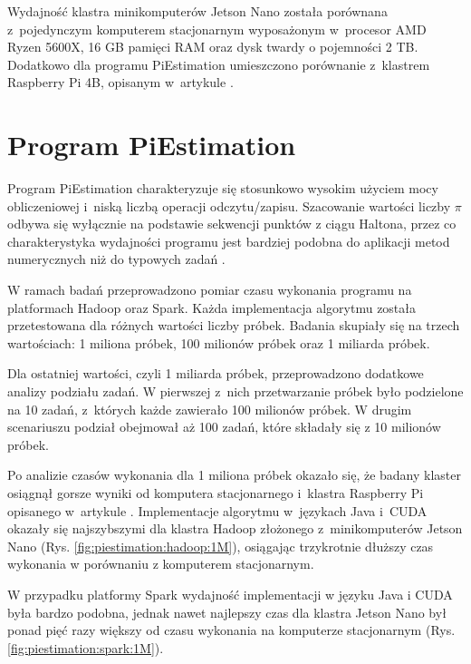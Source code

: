 Wydajność klastra minikomputerów Jetson Nano została porównana z~pojedynczym komputerem stacjonarnym
wyposażonym w~procesor AMD Ryzen 5600X, 16 GB pamięci RAM oraz dysk twardy o pojemności 2 TB.
Dodatkowo dla programu PiEstimation umieszczono porównanie z~klastrem Raspberry Pi 4B, opisanym
w~artykule \cite{rpi-cluster-2}.

\section{Program PiEstimation}

Program PiEstimation charakteryzuje się stosunkowo wysokim użyciem mocy obliczeniowej i~niską liczbą
operacji odczytu/zapisu. Szacowanie wartości liczby $\pi$ odbywa się wyłącznie na podstawie sekwencji
punktów z ciągu Haltona, przez co charakterystyka wydajności programu jest bardziej podobna do aplikacji
metod numerycznych niż do typowych zadań .

W ramach badań przeprowadzono pomiar czasu wykonania programu na platformach Hadoop oraz Spark.
Każda implementacja algorytmu została przetestowana dla różnych wartości liczby próbek. Badania
skupiały się na trzech wartościach: 1 miliona próbek, 100 milionów próbek oraz 1 miliarda próbek.

Dla ostatniej wartości, czyli 1 miliarda próbek, przeprowadzono dodatkowe analizy podziału zadań.
W pierwszej z~nich przetwarzanie próbek było podzielone na 10 zadań, z~których każde zawierało 100 milionów
próbek. W drugim scenariuszu podział obejmował aż 100 zadań, które składały się z 10 milionów próbek.

Po analizie czasów wykonania dla 1 miliona próbek okazało się, że badany klaster osiągnął gorsze wyniki
od komputera stacjonarnego i~klastra Raspberry Pi opisanego w~artykule \cite{rpi-cluster-2}. Implementacje
algorytmu w~językach Java i~CUDA okazały się najszybszymi dla klastra Hadoop złożonego z~minikomputerów
Jetson Nano (Rys. \ref{fig:piestimation:hadoop:1M}), osiągając trzykrotnie dłuższy czas wykonania w
porównaniu z komputerem stacjonarnym.

W przypadku platformy Spark wydajność implementacji w języku Java i CUDA była bardzo podobna, jednak nawet
najlepszy czas dla klastra Jetson Nano był ponad pięć razy większy od czasu wykonania na
komputerze stacjonarnym (Rys. \ref{fig:piestimation:spark:1M}).

